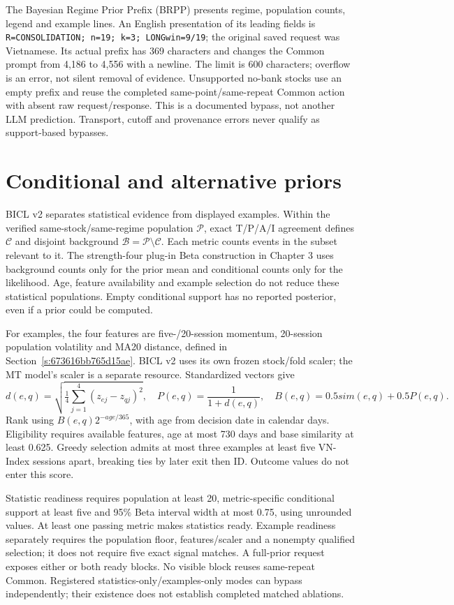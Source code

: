 The Bayesian Regime Prior Prefix (BRPP) presents regime, population
counts, legend and example lines. An English presentation of its leading
fields is \texttt{R=CONSOLIDATION; n=19; k=3; LONGwin=9/19}; the original
saved request was Vietnamese. Its actual prefix has 369 characters and
changes the Common prompt from 4,186 to 4,556 with a newline. The limit is
600 characters; overflow is an error, not silent removal of evidence.
Unsupported no-bank stocks use an empty prefix and reuse the completed
same-point/same-repeat Common action with absent raw request/response.
This is a documented bypass, not another LLM prediction. Transport,
cutoff and provenance errors never qualify as support-based bypasses.

\section{Conditional and alternative priors}\label{s:280f714ba62ef1fc}
BICL v2 separates statistical evidence from displayed examples. Within the
verified same-stock/same-regime population $\mathcal P$, exact T/P/A/I
agreement defines $\mathcal C$ and disjoint background
$\mathcal B=\mathcal P\setminus\mathcal C$. Each metric counts events in the subset relevant to it. The
strength-four plug-in Beta construction in Chapter 3 uses background
counts only for the prior mean and conditional counts only for the
likelihood. Age, feature availability and example selection do not reduce
these statistical populations. Empty conditional support has no reported
posterior, even if a prior could be computed.

For examples, the four features are five-/20-session momentum, 20-session
population volatility and MA20 distance, defined in
Section~\ref{s:673616bb765d15ae}. BICL v2 uses its own frozen stock/fold scaler;
the MT model's scaler is a separate resource. Standardized vectors give
\begin{equation}
d(e,q)=\sqrt{\tfrac14\sum_{j=1}^4(z_{ej}-z_{qj})^2},\quad
P(e,q)=\frac1{1+d(e,q)},\quad B(e,q)=0.5sim(e,q)+0.5P(e,q).
\end{equation}
Rank using $B(e,q)2^{-age/365}$, with age from decision date in calendar
days. Eligibility requires available features, age at most 730 days and
base similarity at least 0.625. Greedy selection admits at most three
examples at least five VN-Index sessions apart, breaking ties by later
exit then ID. Outcome values do not enter this score.

Statistic readiness requires population at least 20, metric-specific
conditional support at least five and 95\% Beta interval width at most
0.75, using unrounded values. At least one passing metric makes statistics
ready. Example readiness separately requires the population floor,
features/scaler and a nonempty qualified selection; it does not require
five exact signal matches. A full-prior request exposes either or both
ready blocks. No visible block reuses same-repeat Common. Registered
statistics-only/examples-only modes can bypass independently; their
existence does not establish completed matched ablations.

